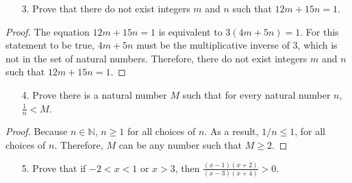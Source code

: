 \documentclass[10pt]{article}
\theoremstyle{definition}
\theoremstyle{plain}
\newcommand{\N}{\mathbb{N}}
\begin{document}
\pagebreak



\begin{enumerate}
  \item[3.] Prove that there do not exist integers $m$ and $n$ such that $12m + 15n = 1$.
\end{enumerate}

\begin{proof}
  The equation $12m + 15n = 1$ is equivalent to $3(4m+5n)=1$. For this statement to be true, $4m+5n$ must be the multiplicative inverse of $3$, which is not in the set of natural numbers. Therefore, there do not exist integers $m$ and $n$ such that $12m + 15n = 1$.
\end{proof}



\pagebreak



\begin{enumerate}
  \item[4.] Prove there is a natural number $M$ such that for every natural number $n$, $\frac{1}{n} < M$.
\end{enumerate}

\begin{proof}
  Because $n\in\N$, $n\geq 1$ for all choices of $n$. As a result, $1/n \leq 1$, for all choices of $n$. Therefore, $M$ can be any number such that $M\geq 2$.
\end{proof}



\pagebreak



\begin{enumerate}
  \item[5.] Prove that if $-2 < x < 1$ or $x > 3$, then $\frac{(x-1)(x+2)}{(x-3)(x+4)} > 0$.
\end{enumerate}
\end{document}
